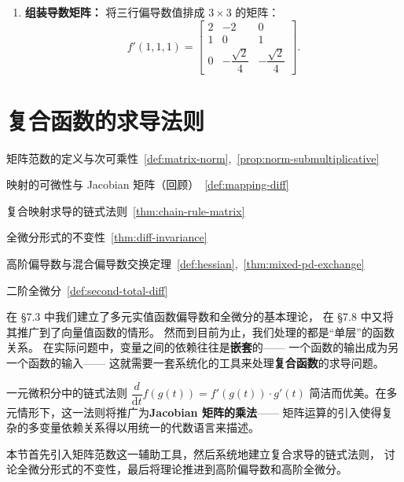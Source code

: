 \documentclass[lang=cn,11pt]{elegantbook}
\begin{document}
\begin{solution}
\begin{enumerate}
  \item \textbf{组装导数矩阵：}
  将三行偏导数值排成 $3 \times 3$ 的矩阵：
  \[
  f'(1,1,1) = \begin{bmatrix} 
  2 & -2 & 0 \\[6pt] 
  1 & 0 & 1 \\[6pt] 
  0 & -\dfrac{\sqrt{2}}{4} & -\dfrac{\sqrt{2}}{4} 
  \end{bmatrix}.
  \]
\end{enumerate}
\end{solution}







\section{复合函数的求导法则}

\begin{introduction}
  \item 矩阵范数的定义与次可乘性~\ref{def:matrix-norm},~\ref{prop:norm-submultiplicative}
  \item 映射的可微性与 Jacobian 矩阵（回顾）~\ref{def:mapping-diff}
  \item 复合映射求导的链式法则~\ref{thm:chain-rule-matrix}
  \item 全微分形式的不变性~\ref{thm:diff-invariance}
  \item 高阶偏导数与混合偏导数交换定理~\ref{def:hessian},~\ref{thm:mixed-pd-exchange}
  \item 二阶全微分~\ref{def:second-total-diff}
\end{introduction}

在 §7.3 中我们建立了多元实值函数偏导数和全微分的基本理论，
在 §7.8 中又将其推广到了向量值函数的情形。
然而到目前为止，我们处理的都是“单层”的函数关系。
在实际问题中，变量之间的依赖往往是\textbf{嵌套}的——
一个函数的输出成为另一个函数的输入——
这就需要一套系统化的工具来处理\textbf{复合函数}的求导问题。

一元微积分中的链式法则 $\dfrac{d}{\mathrm{d}t}f(g(t))=f'(g(t))\cdot g'(t)$
简洁而优美。在多元情形下，这一法则将推广为\textbf{Jacobian 矩阵的乘法}——
矩阵运算的引入使得复杂的多变量依赖关系得以用统一的代数语言来描述。

本节首先引入矩阵范数这一辅助工具，然后系统地建立复合求导的链式法则，
讨论全微分形式的不变性，最后将理论推进到高阶偏导数和高阶全微分。
\end{document}
